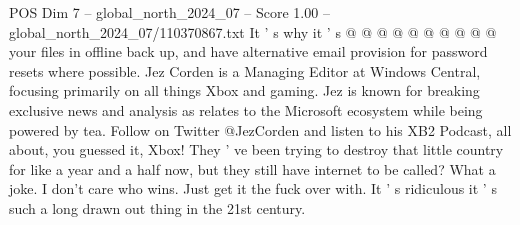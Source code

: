 \begin{textsample}{POS Dim 7 – global\_north\_2024\_07 – Score 1.00 – global\_north\_2024\_07/110370867.txt}
It ' s why it ' s @ @ @ @ @ @ @ @ @ @ your files in offline back up, and have alternative email provision for password resets where possible.
Jez Corden is a Managing Editor at Windows Central, focusing primarily on all things Xbox and gaming.
Jez is known for breaking exclusive news and analysis as relates to the Microsoft ecosystem while being powered by tea.
Follow on Twitter @JezCorden and listen to his XB2 Podcast, all about, you guessed it, Xbox!
They ' ve been trying to destroy that little country for like a year and a half now, but they still have internet to be called?
What a joke.
I don't care who wins.
Just get it the fuck over with.
It ' s ridiculous it ' s such a long drawn out thing in the 21st century.

\end{textsample}

